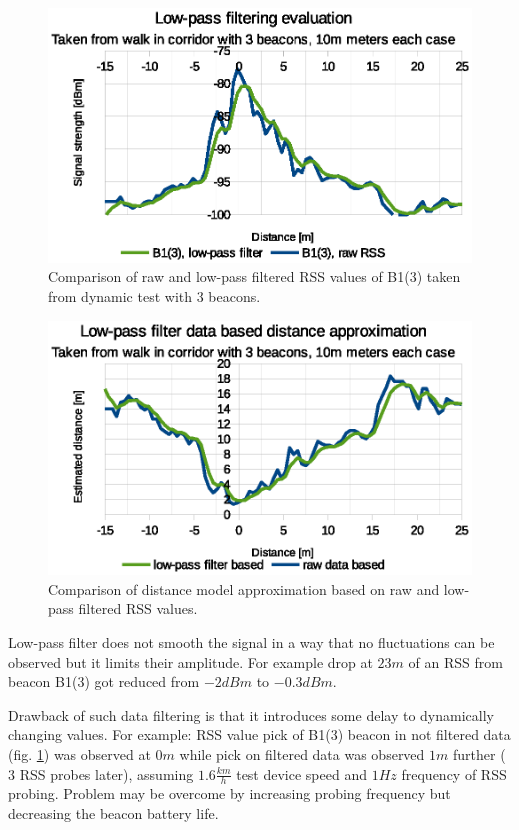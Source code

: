 \documentclass[../main.tex]{subfiles}
\begin{document}
\begin{figure}[!htbp]
\includegraphics[width=\textwidth,clip]{pictures/tests_case10_b1_3_low_pass}
\caption{Comparison of raw and low-pass filtered RSS values of B1(3) taken from dynamic test with 3 beacons.}
\label{fig:tests_case10_b1_3_low_pass}
\end{figure}
\begin{figure}[!htbp]
\includegraphics[width=\textwidth,clip]{pictures/tests_case10_b1_3_low_pass_dist_model}
\caption{Comparison of distance model approximation based on raw and low-pass filtered RSS values.}
\label{fig:tests_case10_b1_3_low_pass_dist_model}
\end{figure}


Low-pass filter does not smooth the signal in a way that no fluctuations can be observed but it limits their amplitude. For example drop at $23m$ of an RSS from beacon B1(3) got reduced from $-2dBm$ to $-0.3dBm$.

Drawback of such data filtering is that it introduces some delay to dynamically changing values. For example: RSS value pick of B1(3) beacon in not filtered data (fig. \ref{fig:tests_case10_b1_3_low_pass}) was observed at $0m$ while pick on filtered data was observed $1m$ further ($3$ RSS probes later), assuming $1.6\frac{km}{h}$ test device speed and $1Hz$ frequency of RSS probing. Problem may be overcome by increasing probing frequency but decreasing the beacon battery life.
\end{document}
